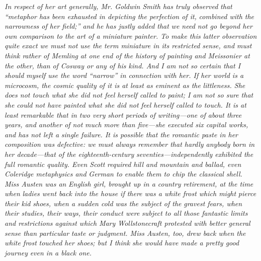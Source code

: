 \documentclass[12pt,openright]{book}
\begin{document}
\textit{In respect of her art generally, Mr. Goldwin Smith has truly observed}\textit{ }\textit{that “metaphor has been exhausted in depicting the perfection of it,}\textit{ }\textit{combined with the narrowness of her field;” and he has justly added that}\textit{ }\textit{we need not go beyond her own comparison to the art of a miniature}\textit{ }\textit{painter. To make this latter observation quite exact we must not use the}\textit{ }\textit{term miniature in its restricted sense, and must think rather of Memling}\textit{ }\textit{at one end of the history of painting and Meissonier at the other, than}\textit{ }\textit{of Cosway or any of his kind. And I am not so certain that I should}\textit{ }\textit{myself use the word “narrow” in connection with her. If her world is a}\textit{ }\textit{microcosm, the cosmic quality of it is at least as eminent as the}\textit{ }\textit{littleness. She does not touch what she did not feel herself called to}\textit{ }\textit{paint; I am not so sure that she could not have painted what she did not}\textit{ }\textit{feel herself called to touch. It is at least remarkable that in two very}\textit{ }\textit{short periods of writing—one of about three years, and another of not}\textit{ }\textit{much more than five—she executed six capital works, and has not left a}\textit{ }\textit{single failure. It is possible that the romantic paste in her}\textit{ }\textit{composition was defective: we must always remember that hardly anybody}\textit{ }\textit{born in her decade—that of the eighteenth-century}\textit{ }\textit{seventies—independently exhibited the full romantic quality. Even Scott}\textit{ }\textit{required hill and mountain and ballad, even Coleridge metaphysics and}\textit{ }\textit{German to enable them to chip the classical shell. Miss Austen was an}\textit{ }\textit{English girl, brought up in a country retirement, at the time when}\textit{ }\textit{ladies went back into the house if there was a white frost which might}\textit{ }\textit{pierce their kid shoes, when a sudden cold was the subject of the}\textit{ }\textit{gravest fears, when their studies, their ways, their conduct were}\textit{ }\textit{subject to all those fantastic limits and restrictions against which}\textit{ }\textit{Mary Wollstonecraft protested with better general sense than particular}\textit{ }\textit{taste or judgment. Miss Austen, too, drew back when the white frost}\textit{ }\textit{touched her shoes; but I think she would have made a pretty good journey}\textit{ }\textit{even in a black one.}
\end{document}
